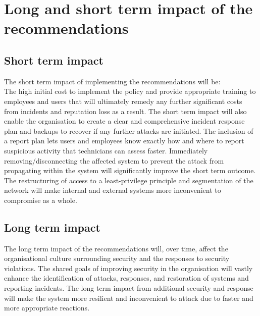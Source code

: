 \documentclass[conference]{IEEEtran}
\begin{document}
\section{Long and short term impact of the recommendations}

\subsection{Short term impact}
The short term impact of implementing the recommendations will be:\\
The high initial cost to implement the policy and provide appropriate training to employees and users that will ultimately remedy any further significant costs from incidents and reputation loss as a result. The short term impact will also enable the organisation to create a clear and comprehensive incident response plan and backups to recover if any further attacks are initiated. The inclusion of a report plan lets users and employees know exactly how and where to report suspicious activity that technicians can assess faster. Immediately removing/disconnecting the affected system to prevent the attack from propagating within the system will significantly improve the short term outcome. The restructuring of access to a least-privilege principle and segmentation of the network will make internal and external systems more inconvenient to compromise as a whole.

\subsection{Long term impact}
The long term impact of the recommendations will, over time, affect the organisational culture surrounding security and the responses to security violations. The shared goals of improving security in the organisation will vastly enhance the identification of attacks, responses, and restoration of systems and reporting incidents. The long term impact from additional security and response will make the system more resilient and inconvenient to attack due to faster and more appropriate reactions.
\end{document}
